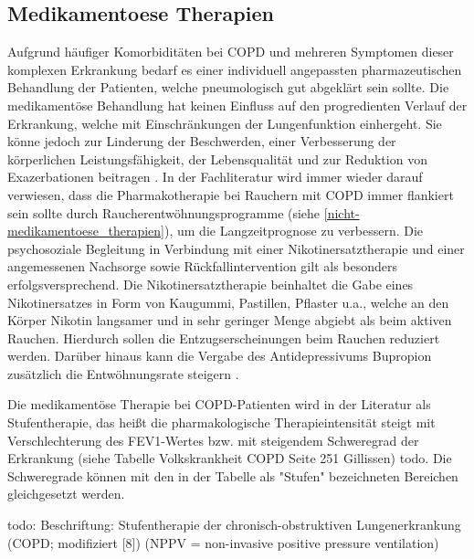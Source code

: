 \subsection{Medikamentoese Therapien}
\label{medikamentoese_therapien}
Aufgrund häufiger Komorbiditäten bei COPD und mehreren Symptomen dieser komplexen Erkrankung bedarf es einer individuell angepassten pharmazeutischen Behandlung der Patienten, welche pneumologisch gut abgeklärt sein sollte. Die medikamentöse Behandlung hat keinen Einfluss auf den progredienten Verlauf der Erkrankung, welche mit Einschränkungen der Lungenfunktion einhergeht. Sie könne jedoch zur Linderung der Beschwerden, einer Verbesserung der körperlichen Leistungsfähigkeit, der Lebensqualität und zur Reduktion von Exazerbationen beitragen \autocite[vgl.][249]{gillissen2007}. In der Fachliteratur wird immer wieder darauf verwiesen, dass die Pharmakotherapie bei Rauchern mit COPD immer flankiert sein sollte durch Raucherentwöhnungsprogramme (siehe \ref{nicht-medikamentoese_therapien}), um die Langzeitprognose zu verbessern. Die psychosoziale Begleitung in Verbindung mit einer Nikotinersatztherapie und einer angemessenen Nachsorge sowie Rückfallintervention gilt als besonders erfolgsversprechend. Die Nikotinersatztherapie beinhaltet die Gabe eines Nikotinersatzes in Form von Kaugummi, Pastillen, Pflaster u.a., welche an den Körper Nikotin langsamer und in sehr geringer Menge abgiebt als beim aktiven Rauchen. Hierdurch sollen die Entzugserscheinungen beim Rauchen reduziert werden. Darüber hinaus kann die Vergabe des Antidepressivums Bupropion zusätzlich die Entwöhnungsrate steigern \autocite[vgl.][e12]{vogelmeier2007}.

Die medikamentöse Therapie bei COPD-Patienten wird in der Literatur als Stufentherapie, das heißt die pharmakologische Therapieintensität steigt mit Verschlechterung des FEV1-Wertes bzw. mit steigendem Schweregrad der Erkrankung (siehe Tabelle Volkskrankheit COPD Seite 251 Gillissen) todo. Die Schweregrade können mit den in der Tabelle als "Stufen" bezeichneten Bereichen gleichgesetzt werden.


todo: Beschriftung: Stufentherapie der chronisch-obstruktiven Lungenerkrankung (COPD; modifiziert [8]) (NPPV = non-invasive positive pressure ventilation)

